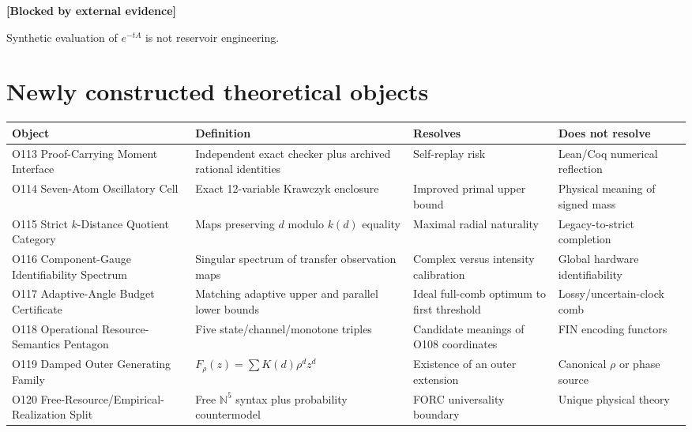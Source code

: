 \documentclass[11pt,a4paper,openany]{report}
\begin{document}
\textbf{[Blocked by external evidence]}

Synthetic evaluation of \(e^{-tA}\) is not reservoir engineering.

\chapter{Newly constructed theoretical objects}

\begin{center}
\begingroup\small
\setlength{\tabcolsep}{2.5pt}
\renewcommand{\arraystretch}{1.16}
\begin{longtable}{@{}p{}p{}p{}p{}@{}}
\toprule
\textbf{Object} & \textbf{Definition} & \textbf{Resolves} & \textbf{Does not resolve} \\
\midrule
\endhead
O113 Proof-Carrying Moment Interface & Independent exact checker plus archived rational identities & Self-replay risk & Lean/\allowbreak{}Coq numerical reflection \\
O114 Seven-Atom Oscillatory Cell & Exact 12-variable Krawczyk enclosure & Improved primal upper bound & Physical meaning of signed mass \\
O115 Strict \(k\)-Distance Quotient Category & Maps preserving \(d\) modulo \(k(d)\) equality & Maximal radial naturality & Legacy-to-strict completion \\
O116 Component-Gauge Identifiability Spectrum & Singular spectrum of transfer observation maps & Complex versus intensity calibration & Global hardware identifiability \\
O117 Adaptive-Angle Budget Certificate & Matching adaptive upper and parallel lower bounds & Ideal full-comb optimum to first threshold & Lossy/\allowbreak{}uncertain-clock comb \\
O118 Operational Resource-Semantics Pentagon & Five state/\allowbreak{}channel/\allowbreak{}monotone triples & Candidate meanings of O108 coordinates & FIN encoding functors \\
O119 Damped Outer Generating Family & \(F_\rho(z)=\sum K(d)\rho^dz^d\) & Existence of an outer extension & Canonical \(\rho\) or phase source \\
O120 Free-Resource/\allowbreak{}Empirical-Realization Split & Free \(\mathbb N^5\) syntax plus probability countermodel & FORC universality boundary & Unique physical theory \\
\bottomrule
\end{longtable}
\endgroup
\end{center}
\end{document}
